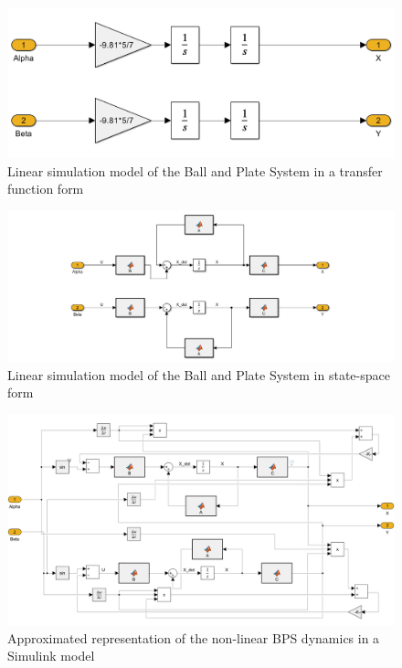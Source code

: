 \begin{figure}[h]
    \centering
    \includegraphics[width=1\linewidth]{Figures/chapter03/Linear_BPS_Simulink_Model_inTransferFunction.jpg}
    \caption{Linear simulation model of the Ball and Plate System in a transfer function form}

\end{figure}
\begin{figure}
    \centering
    \includegraphics[width=1\linewidth]{Figures/chapter03/Linear_BPS_Simulink_Model_inStateSpace.jpg}
    \caption{Linear simulation model of the Ball and Plate System in state-space form}
\end{figure}

\begin{figure}
\centering
\includegraphics[width=0.95\textheight]{Figures/chapter03/nonlinear.png}
\caption{Approximated representation of the non-linear BPS dynamics in a Simulink model}
\label{fig:IMs matrix correlation}
\end{figure}

